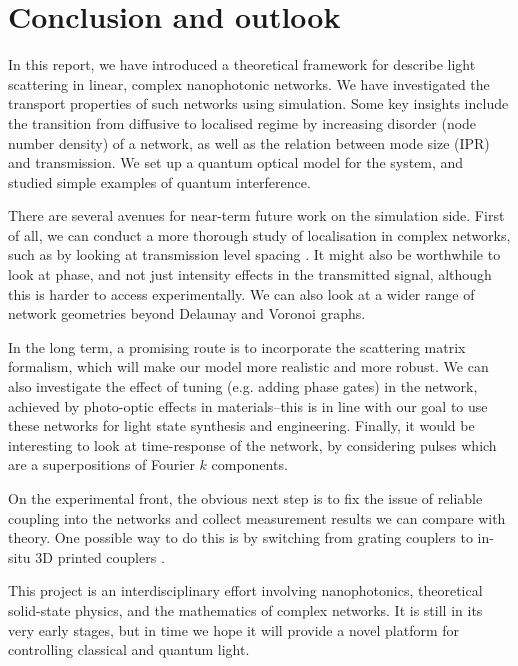 \chapter{Conclusion and outlook}

In this report, we have introduced a theoretical framework for describe light scattering in linear, complex nanophotonic networks. We have investigated the transport properties of such networks using simulation. Some key insights include the transition from diffusive to localised regime by increasing disorder (node number density) of a network, as well as the relation between mode size (IPR) and transmission. We set up a quantum optical model for the system, and studied simple examples of quantum interference. 

There are several avenues for near-term future work on the simulation side. First of all, we can conduct a more thorough study of localisation in complex networks, such as by looking at transmission level spacing \cite{Gaio2017}. It might also be worthwhile to look at phase, and not just intensity effects in the transmitted signal, although this is harder to access experimentally. We can also look at a wider range of network geometries beyond Delaunay and Voronoi graphs.

In the long term, a promising route is to incorporate the scattering matrix formalism, which will make our model more realistic and more robust. We can also investigate the effect of tuning (e.g. adding phase gates) in the network, achieved by photo-optic effects in materials--this is in line with our goal to use these networks for light state synthesis and engineering. Finally, it would be interesting to look at time-response of the network, by considering pulses which are a superpositions of Fourier $k$ components.

On the experimental front, the obvious next step is to fix the issue of reliable coupling into the networks and collect measurement results we can compare with theory. One possible way to do this is by switching from grating couplers to in-situ 3D printed couplers \cite{Dietrich2018}.

This project is an interdisciplinary effort involving nanophotonics, theoretical solid-state physics, and the mathematics of complex networks. It is still in its very early stages, but in time we hope it will provide a novel platform for controlling classical and quantum light.